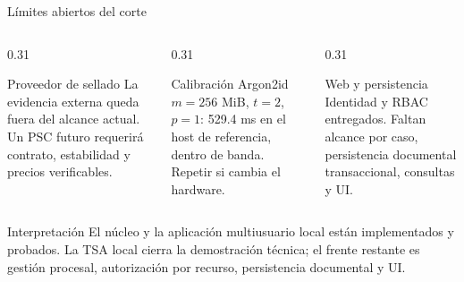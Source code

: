\documentclass[aspectratio=169,11pt]{beamer}
\begin{document}
\begin{frame}{Límites abiertos del corte}
  \begin{columns}[T,onlytextwidth]
    \begin{column}{0.31\textwidth}
      \begin{block}{Proveedor de sellado}
        \small La evidencia externa queda fuera del alcance actual. Un PSC futuro requerirá contrato, estabilidad y precios verificables.
      \end{block}
    \end{column}
    \begin{column}{0.31\textwidth}
      \begin{block}{Calibración Argon2id}
        \small $m=256$ MiB, $t=2$, $p=1$: 529.4 ms en el host de referencia, dentro de banda. Repetir si cambia el hardware.
      \end{block}
    \end{column}
    \begin{column}{0.31\textwidth}
      \begin{block}{Web y persistencia}
        \small Identidad y RBAC entregados. Faltan alcance por caso, persistencia documental transaccional, consultas y UI.
      \end{block}
    \end{column}
  \end{columns}

  \vspace{0.3cm}
  \begin{alertblock}{Interpretación}
    \small El núcleo y la aplicación multiusuario local están implementados y probados. La TSA local cierra la demostración técnica; el frente restante es gestión procesal, autorización por recurso, persistencia documental y UI.
  \end{alertblock}
\end{frame}
\end{document}
